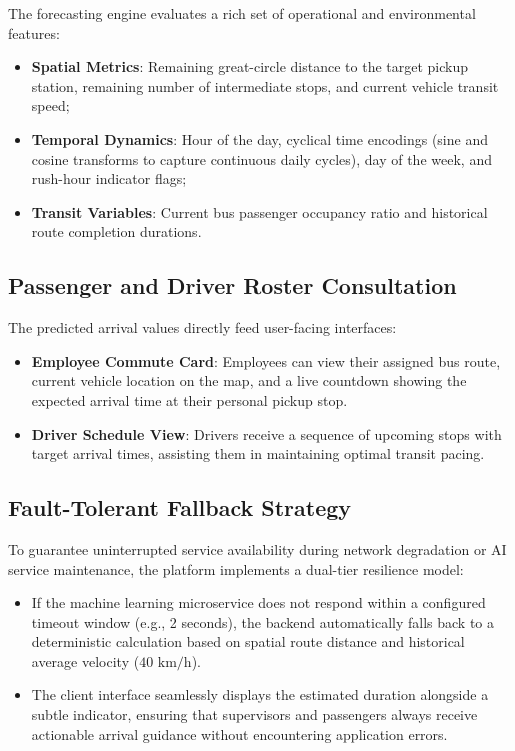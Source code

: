 The forecasting engine evaluates a rich set of operational and environmental features:
\begin{itemize}
  \item \textbf{Spatial Metrics}: Remaining great-circle distance to the target pickup station, remaining number of intermediate stops, and current vehicle transit speed;
  \item \textbf{Temporal Dynamics}: Hour of the day, cyclical time encodings (sine and cosine transforms to capture continuous daily cycles), day of the week, and rush-hour indicator flags;
  \item \textbf{Transit Variables}: Current bus passenger occupancy ratio and historical route completion durations.
\end{itemize}

\subsection{Passenger and Driver Roster Consultation}
The predicted arrival values directly feed user-facing interfaces:
\begin{itemize}
  \item \textbf{Employee Commute Card}: Employees can view their assigned bus route, current vehicle location on the map, and a live countdown showing the expected arrival time at their personal pickup stop.
  \item \textbf{Driver Schedule View}: Drivers receive a sequence of upcoming stops with target arrival times, assisting them in maintaining optimal transit pacing.
\end{itemize}

\subsection{Fault-Tolerant Fallback Strategy}
To guarantee uninterrupted service availability during network degradation or AI service maintenance, the platform implements a dual-tier resilience model:
\begin{itemize}
  \item If the machine learning microservice does not respond within a configured timeout window (e.g., 2 seconds), the backend automatically falls back to a deterministic calculation based on spatial route distance and historical average velocity ($40\text{ km/h}$).
  \item The client interface seamlessly displays the estimated duration alongside a subtle indicator, ensuring that supervisors and passengers always receive actionable arrival guidance without encountering application errors.
\end{itemize}

